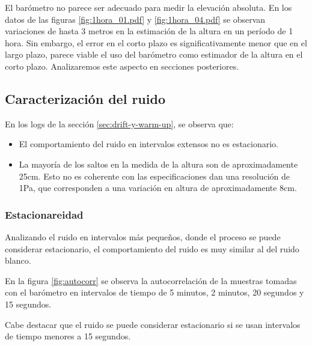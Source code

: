 \documentclass[main]{subfiles}
\begin{document}
El bar\'ometro no parece ser adecuado para medir la elevaci\'on absoluta. En los datos de las figuras \ref{fig:1hora_01.pdf} y \ref{fig:1hora_04.pdf} se observan variaciones de hasta 3 metros en la estimaci\'on de la altura en un per\'iodo de 1 hora. Sin embargo, el error en el corto plazo es significativamente menor que en el largo plazo, parece viable el uso del bar\'ometro como estimador de la altura en el corto plazo. Analizaremos este aspecto en secciones posteriores.

\subsection{Caracterizaci\'on del ruido}
\label{sec:caract-ruido}

En los logs de la secci\'on \ref{sec:drift-y-warm-up}, se observa que:
\begin{itemize}
\item El comportamiento del ruido en intervalos extensos no es estacionario.
\item La mayor\'ia de los saltos en la medida de la altura son de aproximadamente 25cm. Esto no es coherente con las especificaciones dan una resoluci\'on de 1Pa, que corresponden a una variaci\'on en altura de aproximadamente 8cm.
\end{itemize}

\subsubsection{Estacionareidad}

Analizando el ruido en intervalos m\'as peque\~nos, donde el proceso se puede considerar estacionario, el comportamiento del ruido es muy similar al del ruido blanco.

En la figura \ref{fig:autocorr} se observa la autocorrelaci\'on de la muestras tomadas con el bar\'ometro en intervalos de tiempo de 5 minutos, 2 minutos, 20 segundos y 15 segundos.

Cabe destacar que el ruido se puede considerar estacionario si se usan intervalos de tiempo menores a 15 segundos.
\end{document}
